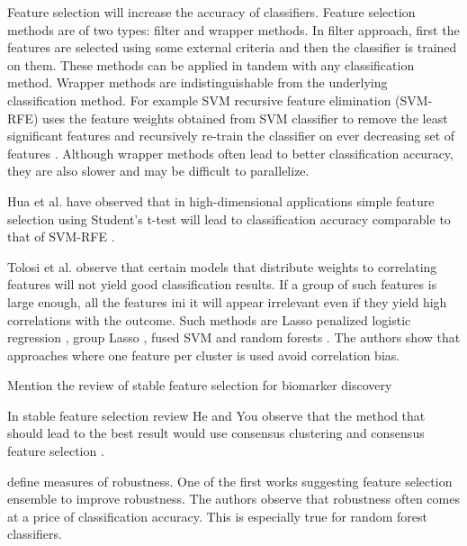 \documentclass{llncs}
\begin{document}
Feature selection will increase the accuracy of classifiers. Feature selection methods are of two types: filter and wrapper methods. In filter approach, first the features are selected using some external criteria and then the classifier is trained on them. These methods can be applied in tandem with any classification method. Wrapper methods are indistinguishable from the underlying classification method. For example SVM recursive feature elimination (SVM-RFE) uses the feature weights obtained from SVM classifier to remove the least significant features and recursively re-train the classifier on ever decreasing set of features
\cite{li2005analysis}. Although wrapper methods often lead to better classification accuracy, they are also slower and may be difficult to parallelize.


Hua et al. have observed that in high-dimensional applications simple feature selection using Student's t-test will lead to classification accuracy comparable to that of SVM-RFE \cite{hua2009performance}.

Tolosi et al. \cite{tolosi2011classification} observe that certain models that
distribute weights to correlating features will not yield good classification
results. If a group of such features is large enough, all the features ini it
will appear irrelevant even if they yield high correlations with the outcome.
Such methods are Lasso penalized logistic regression \cite{park2008penalized},
group Lasso \cite{meier2008group}, fused SVM \cite{rapaport2008classification}
and random forests \cite{breiman2001random}. The authors show that approaches
where one feature per cluster is used avoid correlation bias.



Mention the review of stable feature selection for biomarker discovery

In stable feature selection review He and You observe that the method that should lead to the best result would use consensus clustering and consensus feature selection \cite{he2010stable}.





\cite{saeys2008robust} define measures of robustness. One of the first works suggesting feature selection ensemble to improve robustness. The authors observe that robustness often comes at a price of classification accuracy. 
This is especially true for random forest classifiers. 
\end{document}
